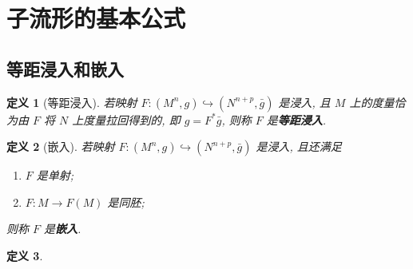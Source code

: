 \documentclass{ctexart}
\newtheorem{definition}{定义}
\begin{document}
\section{子流形的基本公式}
\subsection{等距浸入和嵌入}
\begin{definition}[等距浸入]
	若映射 $F\colon (M^n, g) \hookrightarrow (N^{n + p}, \bar{g})$ 是浸入, 且 $M$ 上的度量恰为由 $F$ 将 $N$ 上度量拉回得到的, 即 $g = F^{\ast}\bar{g}$, 则称 $F$ 是{\bf 等距浸入}.
\end{definition}
\begin{definition}[嵌入]
	若映射 $F\colon (M^n, g) \hookrightarrow (N^{n + p}, \bar{g})$ 是浸入, 且还满足
	\begin{enumerate}
		\item $F$ 是单射;
		\item $F\colon M \rightarrow F(M)$ 是同胚;
	\end{enumerate}
	则称 $F$ 是{\bf 嵌入}.
\end{definition}
\begin{definition}
\end{definition}
\end{document}
